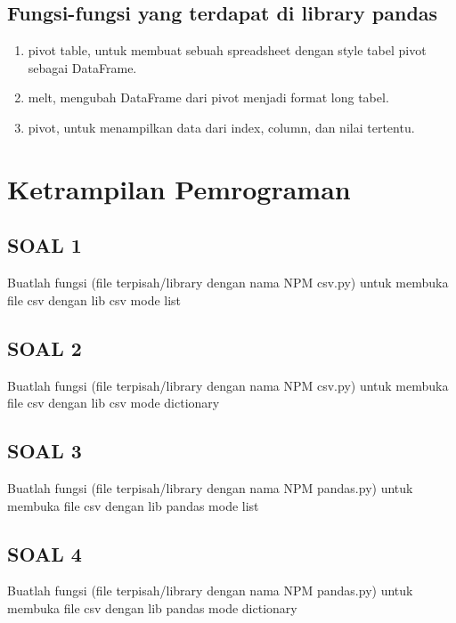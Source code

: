 \documentclass[12pt, times new roman]{report}
\begin{document}
\section{Fungsi-fungsi yang terdapat di library pandas}

\begin{enumerate}
    \item pivot table, untuk membuat sebuah spreadsheet dengan style tabel pivot sebagai DataFrame.
    \item melt, mengubah DataFrame dari pivot menjadi format long tabel.
    \item pivot, untuk menampilkan data dari index, column, dan nilai tertentu.
\end{enumerate}

\newpage

\chapter{Ketrampilan Pemrograman}

\section*{SOAL 1}
Buatlah fungsi (file terpisah/library dengan nama NPM csv.py) untuk membuka file csv dengan lib csv mode list


\section*{SOAL 2}
Buatlah fungsi (file terpisah/library dengan nama NPM csv.py) untuk membuka file csv dengan lib csv mode dictionary



\section*{SOAL 3}
Buatlah fungsi (file terpisah/library dengan nama NPM pandas.py) untuk membuka file csv dengan lib pandas mode list



\section*{SOAL 4}
Buatlah fungsi (file terpisah/library dengan nama NPM pandas.py) untuk membuka file csv dengan lib pandas mode dictionary
\end{document}
